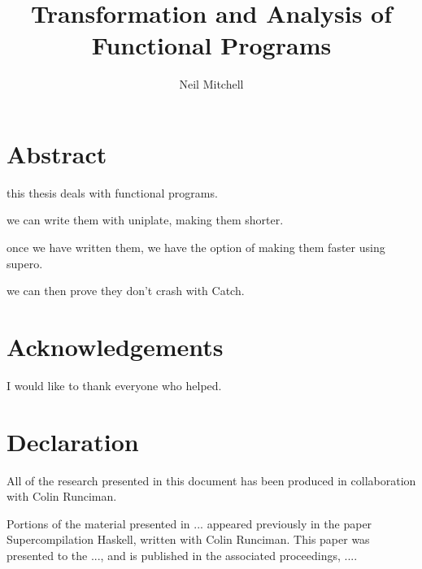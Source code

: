 \author{Neil Mitchell}
\title{Transformation and Analysis of Functional Programs}

\maketitle

\chapter*{Abstract}
this thesis deals with functional programs.

we can write them with uniplate, making them shorter.

once we have written them, we have the option of making them faster using supero.

we can then prove they don't crash with Catch.


\tableofcontents

\listoffigures

\chapter*{Acknowledgements}

I would like to thank everyone who helped.

\chapter*{Declaration}

All of the research presented in this document has been produced in collaboration with Colin Runciman.

Portions of the material presented in ... appeared previously in the paper Supercompilation Haskell, written with Colin Runciman. This paper was presented to the ..., and is published in the associated proceedings, ....


